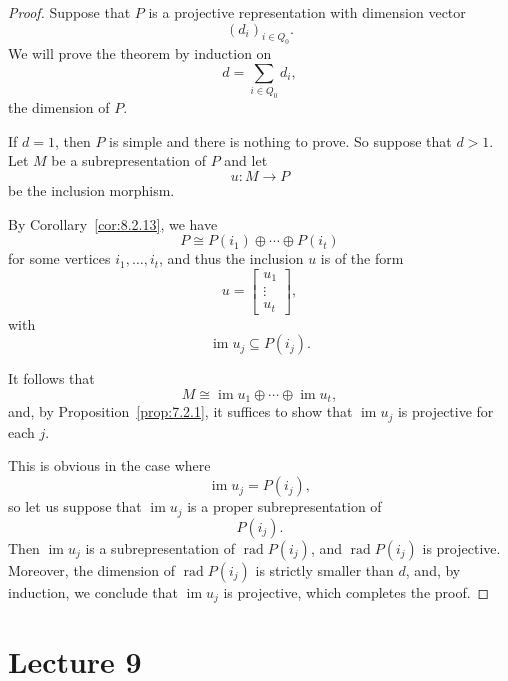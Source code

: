 \documentclass[11pt, a4paper]{report}
\begin{document}
            \begin{proof}
            Suppose that $P$ is a projective representation with dimension vector
            \[
            (d_i)_{i\in Q_0}.
            \]
            We will prove the theorem by induction on
            \[
            d=\sum_{i\in Q_0} d_i,
            \]
            the dimension of $P$.

            If $d=1$, then $P$ is simple and there is nothing to prove. So suppose that $d>1$.
            Let $M$ be a subrepresentation of $P$ and let
            \[
            u\colon M \to P
            \]
            be the inclusion morphism.

            By Corollary~\ref{cor:8.2.13}, we have
            \[
            P \cong P(i_1)\oplus \cdots \oplus P(i_t)
            \]
            for some vertices $i_1,\dots,i_t$, and thus the inclusion $u$ is of the form
            \[
            u=
            \begin{bmatrix}
            u_1\\
            \vdots\\
            u_t
            \end{bmatrix},
            \]
            with
            \[
            \operatorname{im} u_j \subseteq P(i_j).
            \]

            It follows that
            \[
            M \cong \operatorname{im} u_1 \oplus \cdots \oplus \operatorname{im} u_t,
            \]
            and, by Proposition~\ref{prop:7.2.1}, it suffices to show that $\operatorname{im} u_j$ is projective
            for each $j$.

            This is obvious in the case where
            \[
            \operatorname{im} u_j = P(i_j),
            \]
            so let us suppose that $\operatorname{im} u_j$ is a proper subrepresentation of
            \[
            P(i_j).
            \]
            Then $\operatorname{im} u_j$ is a subrepresentation of $\operatorname{rad} P(i_j)$,
            and $\operatorname{rad} P(i_j)$ is projective. Moreover, the
            dimension of $\operatorname{rad} P(i_j)$ is strictly smaller than $d$, and, by
            induction, we conclude that $\operatorname{im} u_j$ is projective, which completes
            the proof.
            \end{proof}

\chapter{Lecture 9}
\end{document}
